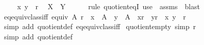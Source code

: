 \begin{isabellebody}
\isamarkupfalse%
\isanewline
\ \ \isamarkupfalse%
\ {\isasymsection}{\isacharcolon}{\kern0pt}\ {\isachardoublequoteopen}{\isacharparenleft}{\kern0pt}x{\isacharcomma}{\kern0pt}\ y{\isacharparenright}{\kern0pt}\ {\isasymin}\ r{\isachardoublequoteclose}\ \isamarkupfalse%
\ {\isachardoublequoteopen}X\ {\isacharequal}{\kern0pt}\ Y{\isachardoublequoteclose}\isanewline
\ \ \ \ \isamarkupfalse%
\ {\isacharparenleft}{\kern0pt}rule\ quotient{\isacharunderscore}{\kern0pt}eqI{\isacharparenright}{\kern0pt}\ {\isacharparenleft}{\kern0pt}use\ {\isasymsection}\ assms\ \ {\isacartoucheopen}blast{\isacharplus}{\kern0pt}{\isacartoucheclose}{\isacharparenright}{\kern0pt}\isanewline
{}\isamarkupfalse%
%
\endisatagproof
{\isafoldproof}%
%
\isadelimproof
\isanewline
%
\endisadelimproof
\isanewline
{}\isamarkupfalse%
\ eq{\isacharunderscore}{\kern0pt}equiv{\isacharunderscore}{\kern0pt}class{\isacharunderscore}{\kern0pt}iff{}{\isacharcolon}{\kern0pt}\ {\isachardoublequoteopen}equiv\ A\ r\ {\isasymLongrightarrow}\ x\ {\isasymin}\ A\ {\isasymLongrightarrow}\ y\ {\isasymin}\ A\ {\isasymLongrightarrow}\ {\isacharbraceleft}{\kern0pt}x{\isacharbraceright}{\kern0pt}{\isacharslash}{\kern0pt}{\isacharslash}{\kern0pt}r\ {\isacharequal}{\kern0pt}\ {\isacharbraceleft}{\kern0pt}y{\isacharbraceright}{\kern0pt}{\isacharslash}{\kern0pt}{\isacharslash}{\kern0pt}r\ {\isasymlongleftrightarrow}\ {\isacharparenleft}{\kern0pt}x{\isacharcomma}{\kern0pt}\ y{\isacharparenright}{\kern0pt}\ {\isasymin}\ r{\isachardoublequoteclose}\isanewline
%
\isadelimproof
\ \ %
\endisadelimproof
%
\isatagproof
{}\isamarkupfalse%
\ {\isacharparenleft}{\kern0pt}simp\ add{\isacharcolon}{\kern0pt}\ quotient{\isacharunderscore}{\kern0pt}def\ eq{\isacharunderscore}{\kern0pt}equiv{\isacharunderscore}{\kern0pt}class{\isacharunderscore}{\kern0pt}iff{\isacharparenright}{\kern0pt}%
\endisatagproof
{\isafoldproof}%
%
\isadelimproof
\isanewline
%
\endisadelimproof
\isanewline
{}\isamarkupfalse%
\ quotient{\isacharunderscore}{\kern0pt}empty\ {\isacharbrackleft}{\kern0pt}simp{\isacharbrackright}{\kern0pt}{\isacharcolon}{\kern0pt}\ {\isachardoublequoteopen}{\isacharbraceleft}{\kern0pt}{\isacharbraceright}{\kern0pt}{\isacharslash}{\kern0pt}{\isacharslash}{\kern0pt}r\ {\isacharequal}{\kern0pt}\ {\isacharbraceleft}{\kern0pt}{\isacharbraceright}{\kern0pt}{\isachardoublequoteclose}\isanewline
%
\isadelimproof
\ \ %
\endisadelimproof
%
\isatagproof
{}\isamarkupfalse%
\ {\isacharparenleft}{\kern0pt}simp\ add{\isacharcolon}{\kern0pt}\ quotient{\isacharunderscore}{\kern0pt}def{\isacharparenright}{\kern0pt}%

\end{isabellebody}
